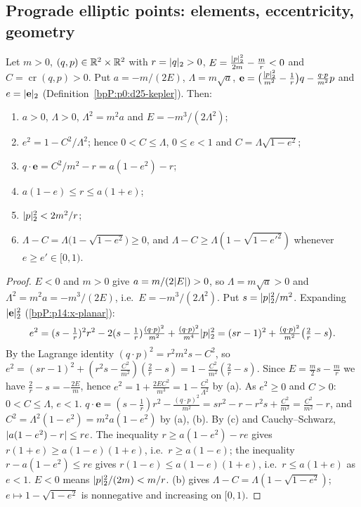 \subsection{Prograde elliptic points: elements, eccentricity, geometry}\label{bpP:p14:sec-elements}

\begin{lemma}\label{bpP:p14:elements}
Let $m>0$, $(q,p)\in\mathbb{R}^2\times\mathbb{R}^2$ with $r=\lvert q\rvert_2>0$, $E=\frac{\lvert p\rvert_2^2}{2m}-\frac mr<0$ and $C=\operatorname{cr}(q,p)>0$. Put $a=-m/(2E)$, $\Lambda=m\sqrt a$,
$\mathbf e=\bigl(\frac{\lvert p\rvert_2^2}{m^2}-\frac1r\bigr)q-\frac{q\cdot p}{m^2}p$ and $e=\lvert \mathbf e\rvert_2$ (Definition~\ref{bpP:p0:d25-kepler}). Then:
\begin{enumerate}[label=(\alph*)]
\item $a>0$, $\Lambda>0$, $\Lambda^2=m^2a$ and $E=-m^3/(2\Lambda^2)$;
\item $e^2=1-C^2/\Lambda^2$; hence $0<C\le\Lambda$, $0\le e<1$ and $C=\Lambda\sqrt{1-e^2}$;
\item $q\cdot\mathbf e=C^2/m^2-r=a(1-e^2)-r$;
\item $a(1-e)\le r\le a(1+e)$;
\item $\lvert p\rvert_2^2<2m^2/r$;
\item $\Lambda-C=\Lambda\bigl(1-\sqrt{1-e^2}\bigr)\ge0$, and $\Lambda-C\ge\Lambda(1-\sqrt{1-e'^2})$ whenever $e\ge e'\in[0,1)$.
\end{enumerate}
\end{lemma}
\begin{proof}
\label{stepP:p14:el-a} $E<0$ and $m>0$ give $a=m/(2\lvert E\rvert)>0$, so $\Lambda=m\sqrt a>0$ and $\Lambda^2=m^2a=-m^3/(2E)$, i.e.\ $E=-m^3/(2\Lambda^2)$.
\label{stepP:p14:el-b} Put $s=\lvert p\rvert_2^2/m^2$. Expanding $\lvert \mathbf e\rvert_2^2$ (\ref{bpP:p14:x-planar}):
\[e^2=(s-\tfrac1r)^2r^2-2(s-\tfrac1r)\tfrac{(q\cdot p)^2}{m^2}+\tfrac{(q\cdot p)^2}{m^4}\lvert p\rvert_2^2=(sr-1)^2+\tfrac{(q\cdot p)^2}{m^2}\bigl(\tfrac2r-s\bigr).\]
By the Lagrange identity $(q\cdot p)^2=r^2m^2s-C^2$, so $e^2=(sr-1)^2+(r^2s-\tfrac{C^2}{m^2})(\tfrac2r-s)=1-\tfrac{C^2}{m^2}(\tfrac2r-s)$. Since $E=\tfrac m2s-\tfrac mr$ we have $\tfrac2r-s=-\tfrac{2E}m$, hence
$e^2=1+\tfrac{2EC^2}{m^3}=1-\tfrac{C^2}{\Lambda^2}$ by (a). As $e^2\ge0$ and $C>0$: $0<C\le\Lambda$, $e<1$.
\label{stepP:p14:el-c} $q\cdot\mathbf e=(s-\tfrac1r)r^2-\tfrac{(q\cdot p)^2}{m^2}=sr^2-r-r^2s+\tfrac{C^2}{m^2}=\tfrac{C^2}{m^2}-r$, and $C^2=\Lambda^2(1-e^2)=m^2a(1-e^2)$ by (a), (b).
\label{stepP:p14:el-d} By (c) and Cauchy--Schwarz, $\lvert a(1-e^2)-r\rvert\le re$. The inequality $r\ge a(1-e^2)-re$ gives $r(1+e)\ge a(1-e)(1+e)$, i.e.\ $r\ge a(1-e)$; the inequality $r-a(1-e^2)\le re$ gives $r(1-e)\le a(1-e)(1+e)$, i.e.\ $r\le a(1+e)$ as $e<1$.
\label{stepP:p14:el-e} $E<0$ means $\lvert p\rvert_2^2/(2m)<m/r$.
\label{stepP:p14:el-f} (b) gives $\Lambda-C=\Lambda(1-\sqrt{1-e^2})$; $e\mapsto1-\sqrt{1-e^2}$ is nonnegative and increasing on $[0,1)$.
\end{proof}

